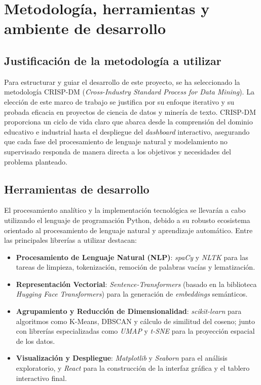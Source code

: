 \section{Metodología, herramientas y ambiente de desarrollo}
\label{cap:Methodology}

\subsection{Justificación de la metodología a utilizar}
\label{sec:crisp_dm}
Para estructurar y guiar el desarrollo de este proyecto, se ha seleccionado la metodología CRISP-DM (\textit{Cross-Industry Standard Process for Data Mining}). La elección de este marco de trabajo se justifica por su enfoque iterativo y su probada eficacia en proyectos de ciencia de datos y minería de texto. CRISP-DM proporciona un ciclo de vida claro que abarca desde la comprensión del dominio educativo e industrial hasta el despliegue del \textit{dashboard} interactivo, asegurando que cada fase del procesamiento de lenguaje natural y modelamiento no supervisado responda de manera directa a los objetivos y necesidades del problema planteado.

\subsection{Herramientas de desarrollo}
\label{sec:tools}
El procesamiento analítico y la implementación tecnológica se llevarán a cabo utilizando el lenguaje de programación Python, debido a su robusto ecosistema orientado al procesamiento de lenguaje natural y aprendizaje automático. Entre las principales librerías a utilizar destacan:
\begin{itemize}
    \item \textbf{Procesamiento de Lenguaje Natural (NLP)}: \textit{spaCy} y \textit{NLTK} para las tareas de limpieza, tokenización, remoción de palabras vacías y lematización.
    \item \textbf{Representación Vectorial}: \textit{Sentence-Transformers} (basado en la biblioteca \textit{Hugging Face Transformers}) para la generación de \textit{embeddings} semánticos.
    \item \textbf{Agrupamiento y Reducción de Dimensionalidad}: \textit{scikit-learn} para algoritmos como K-Means, DBSCAN y cálculo de similitud del coseno; junto con librerías especializadas como \textit{UMAP} y \textit{t-SNE} para la proyección espacial de los datos.
    \item \textbf{Visualización y Despliegue}: \textit{Matplotlib} y \textit{Seaborn} para el análisis exploratorio, y \textit{React} para la construcción de la interfaz gráfica y el tablero interactivo final.
\end{itemize}

